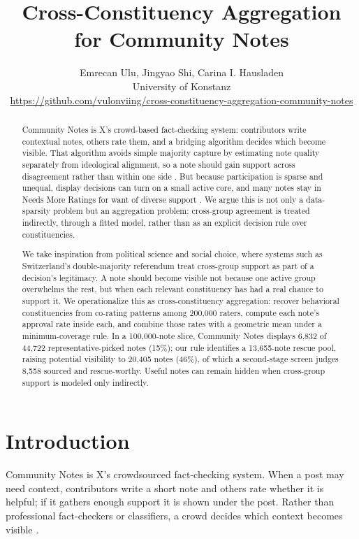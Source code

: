 \documentclass[10pt,twocolumn]{article}
\title{\textbf{Cross-Constituency Aggregation for Community Notes}}
\author{
Emrecan Ulu, Jingyao Shi, Carina I. Hausladen\\
University of Konstanz\\[2pt]
{\small\url{https://github.com/vulonviing/cross-constituency-aggregation-community-notes}}
}
\date{}
\begin{document}
\maketitle

\begin{abstract}
Community Notes is X's crowd-based fact-checking system: contributors write
contextual notes, others rate them, and a bridging algorithm decides which
become visible. That algorithm avoids simple majority capture by estimating
note quality separately from ideological alignment, so a note should gain
support across disagreement rather than within one side
\citep{wojcik2022birdwatch,xcommunitynotes2026ranking}. But because
participation is sparse and unequal, display decisions can turn on a small
active core, and many notes stay in Needs More Ratings for want of diverse
support \citep{goyal2026qsmf,razuvayevskaya2025timeliness}. We argue this is not
only a data-sparsity problem but an aggregation problem: cross-group agreement
is treated indirectly, through a fitted model, rather than as an explicit
decision rule over constituencies.

We take inspiration from political science and social choice, where systems such
as Switzerland's double-majority referendum treat cross-group support as part of
a decision's legitimacy. A note should become visible not because one active
group overwhelms the rest, but when each relevant constituency has had a real
chance to support it. We operationalize this as cross-constituency aggregation:
recover behavioral constituencies from co-rating patterns among 200,000 raters,
compute each note's approval rate inside each, and combine those rates with a
geometric mean under a minimum-coverage rule. In a 100,000-note slice, Community
Notes displays 6,832 of 44,722 representative-picked notes (15\%); our rule
identifies a 13,655-note rescue pool, raising potential visibility to 20,405
notes (46\%), of which a second-stage screen judges 8,558 sourced and
rescue-worthy. Useful notes can remain hidden when cross-group support is
modeled only indirectly.
\end{abstract}

\section{Introduction}

Community Notes is X's crowdsourced fact-checking system. When a post may need
context, contributors write a short note and others rate whether it is helpful;
if it gathers enough support it is shown under the post. Rather than
professional fact-checkers or classifiers, a crowd decides which context becomes
visible \citep{wojcik2022birdwatch,xcommunitynotes2026ranking}.
\end{document}
